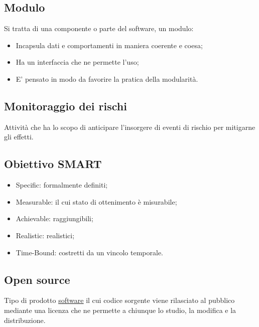 	
	\subsection{Modulo}
	\label{sec:modulo}
	Si tratta di una componente o parte del software, un modulo:
	\begin{itemize}
	\item Incapsula dati e comportamenti in maniera coerente e coesa;
	\item Ha un interfaccia che ne permette l'uso;
	\item E' pensato in modo da favorire la pratica della modularità.
	\end{itemize}
	
	
	\subsection{Monitoraggio dei rischi}
	\label{sec:monitoraggiorischi}
	Attività che ha lo scopo di anticipare l'insorgere di eventi di rischio per mitigarne gli effetti.	
	

	\newpage

	\subsection{Obiettivo SMART}
	\label{sec:smart}
	\begin{itemize}
			\item Specific: formalmente definiti;
			\item Measurable: il cui stato di ottenimento è misurabile;
			\item Achievable: raggiungibili;
			\item Realistic: realistici;
			\item Time-Bound: costretti da un vincolo temporale.
		\end{itemize}


		
	\subsection{Open source}
	\label{sec:opensource}
	Tipo di prodotto \underline{\hyperref[sec:prodottosoftware]{software}} il cui codice sorgente viene rilasciato al pubblico mediante una licenza che ne permette a chiunque lo studio, la modifica e la distribuzione.
		

	\newpage



